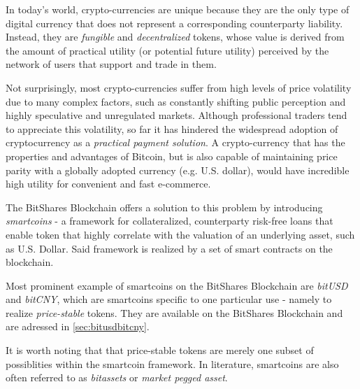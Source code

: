 \label{sec:mpa}
In today's world, crypto-currencies are unique because they are the only type
of digital currency that does not represent a corresponding counterparty
liability. Instead, they are \emph{fungible} and \emph{decentralized} tokens, whose
value is derived from the amount of practical utility (or potential future
utility) perceived by the network of users that support and trade in them.

Not surprisingly, most crypto-currencies suffer from high levels of price
volatility due to many complex factors, such as constantly shifting
public perception and highly speculative and unregulated markets.
Although professional traders tend to appreciate this volatility, so far
it has hindered the widespread adoption of cryptocurrency as a
\emph{practical payment solution}. A crypto-currency that has the
properties and advantages of Bitcoin, but is also capable of maintaining
price parity with a globally adopted currency (e.g. U.S. dollar), would
have incredible high utility for convenient and fast e-commerce.

The BitShares Blockchain offers a solution to this problem by introducing
\emph{smartcoins} - a framework for collateralized, counterparty risk-free loans
that enable token that highly correlate with the valuation of an
underlying asset, such as U.S. Dollar. Said framework is realized by a set of smart contracts
on the blockchain. 

Most prominent example of smartcoins on the BitShares Blockchain are 
\emph{bitUSD} and \emph{bitCNY}, which are smartcoins specific to one particular use
- namely to realize \emph{price-stable} tokens. They are available on
the BitShares Blockchain and are adressed in \cref{sec:bitusdbitcny}.

 It is worth noting that that
price-stable tokens are merely one subset of possiblities within the
smartcoin framework. In literature, smartcoins are also often referred
to as \emph{bitassets} or \emph{market pegged asset}.